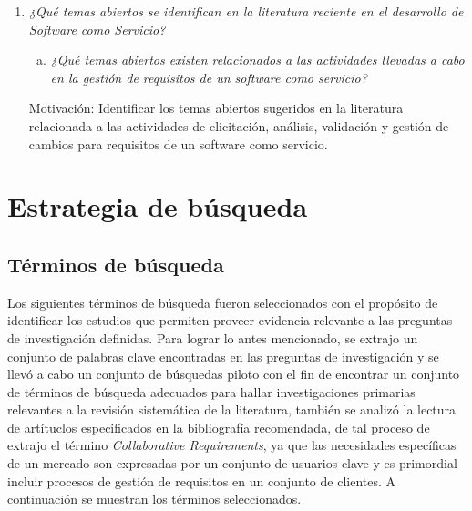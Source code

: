 \documentclass{article}
\begin{document}
\begin{enumerate}[P 1.-]
  \item\emph{¿Qué temas abiertos se identifican en la literatura reciente en el desarrollo de Software como Servicio?}
  \begin{enumerate}[(a)]
  \item \emph{¿Qué temas abiertos existen relacionados a las actividades llevadas a cabo en la gestión de requisitos de un software como servicio?}
  \end{enumerate}
  Motivación: Identificar los temas abiertos sugeridos en la literatura relacionada a las actividades de elicitación, análisis, validación y gestión de cambios 
 para requisitos de un software como servicio.
\end{enumerate}


\section{Estrategia de búsqueda}\label{Estrategia de búsqueda}

\subsection{Términos de búsqueda}
Los siguientes términos de búsqueda fueron seleccionados con el propósito de identificar los estudios que 
permiten proveer evidencia relevante a las preguntas de investigación definidas. 
Para lograr lo antes mencionado, se extrajo un conjunto de palabras clave encontradas en las 
preguntas de investigación y se llevó a cabo un conjunto de búsquedas piloto con el fin de encontrar
un conjunto de términos de búsqueda adecuados para hallar investigaciones primarias relevantes a 
la revisión sistemática de la literatura, también se analizó la lectura de artítuclos especificados en la bibliografía recomendada, 
de tal proceso de extrajo el término \emph{Collaborative Requirements}, ya que las necesidades 
específicas de un mercado son expresadas por un conjunto de usuarios clave y es primordial incluir procesos de gestión de requisitos 
en un conjunto de clientes.
A continuación se muestran los términos seleccionados.
\end{document}
